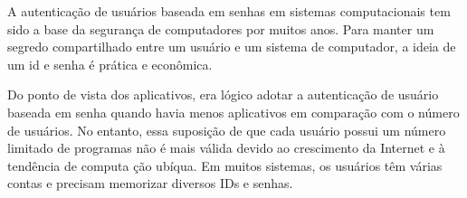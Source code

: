 A autenticação de usuários baseada em senhas em sistemas computacionais tem
sido a base da segurança de computadores por muitos anos.
Para manter um segredo compartilhado entre um usuário e um sistema de
computador,
a ideia de um \acrshort{id} e senha é prática e econômica\cite{conklin2004}.

Do ponto de vista dos aplicativos, era lógico adotar a autenticação de usuário
baseada em senha quando havia menos aplicativos em comparação com o número de
usuários.
No entanto, essa suposição de que cada usuário possui um número limitado de
programas
não é mais válida devido ao crescimento da Internet e à tendência de computa
ção ubíqua.
Em muitos sistemas, os usuários têm várias contas e precisam memorizar diversos
IDs e senhas\cite{conklin2004}.